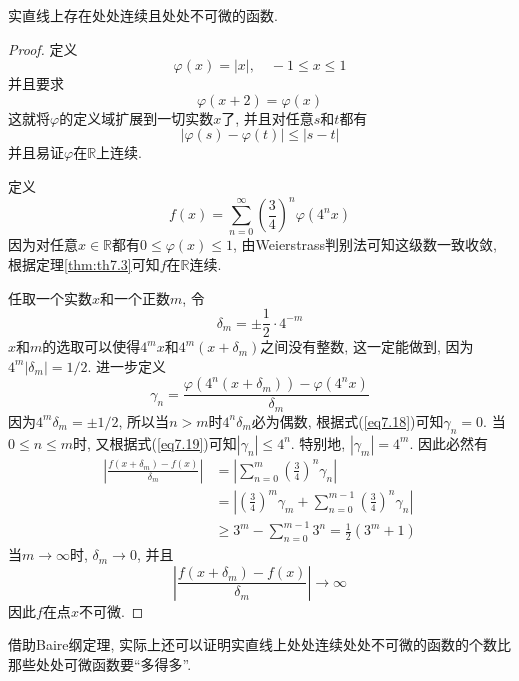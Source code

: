 \documentclass[cn,12pt,math=mtpro2,citestyle=gb7714-2015,bibstyle=gb7714-2015,twocol]{elegantbook}
\newcommand{\R}{\mathbb{R}}
\begin{document}
\begin{theorem}
  实直线上存在处处连续且处处不可微的函数.
\end{theorem}
\begin{proof}
  定义
  $$\varphi(x)=|x|, \quad -1\leq x\leq 1$$
  并且要求
  \begin{equation}\label{eq7.18}
    \varphi(x+2)=\varphi(x)
  \end{equation}
  这就将$\varphi$的定义域扩展到一切实数$x$了, 并且对任意$s$和$t$都有
  \begin{equation}\label{eq7.19}
    |\varphi(s)-\varphi(t)|\leq|s-t|
  \end{equation}
  并且易证$\varphi$在$\R$上连续.

  定义
$$f(x)=\sum_{n=0}^{\infty}\left(\frac{3}{4}\right)^n\varphi(4^nx)$$
  因为对任意$x\in\R$都有$0\leq\varphi(x)\leq 1$, 由Weierstrass判别法可知这级数一致收敛, 根据定理\ref{thm:th7.3}可知$f$在$\R$连续.

  任取一个实数$x$和一个正数$m$, 令
  $$\delta_m=\pm\frac{1}{2}\cdot 4^{-m}$$
  $x$和$m$的选取可以使得$4^mx$和$4^m(x+\delta_m)$之间没有整数, 这一定能做到, 因为$\displaystyle 4^m|\delta_m|=1/2$. 进一步定义
  $$\gamma_n=\frac{\varphi(4^n(x+\delta_m))-\varphi(4^nx)}{\delta_m}$$
  因为$4^m\delta_m=\pm\displaystyle1/2$, 所以当$n>m$时$4^n\delta_m$必为偶数, 根据式(\ref{eq7.18})可知$\gamma_n=0$. 当$0\leq n\leq m$时, 又根据式(\ref{eq7.19})可知$|\gamma_n|\leq 4^n$. 特别地, $|\gamma_m|=4^m$. 因此必然有
  \begin{align*}
  \left|\frac{f(x+\delta_m)-f(x)}{\delta_m}\right|&=\left| \sum_{n=0}^{m}\left(\frac{3}{4}\right)^n\gamma_n\right| \\
  &=\left|\left(\frac{3}{4}\right)^m\gamma_m+ \sum_{n=0}^{m-1}\left(\frac{3}{4}\right)^n\gamma_n\right| \\
  &\geq 3^m-\sum_{n=0}^{m-1}3^n=\frac{1}{2}(3^m+1)
  \end{align*}
  当$m\to\infty$时, $\delta_m\to 0$, 并且
  $$\displaystyle \left|\frac{f(x+\delta_m)-f(x)}{\delta_m}\right|\to\infty$$因此$f$在点$x$不可微.

\end{proof}
\begin{remark}
借助Baire纲定理, 实际上还可以证明实直线上处处连续处处不可微的函数的个数比那些处处可微函数要“多得多”.
\end{remark}
\end{document}
